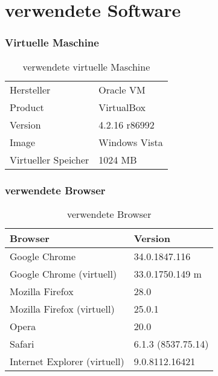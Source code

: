 	\section{verwendete Software}
	
	\subsubsection{Virtuelle Maschine}
	\begin{table}[H]
	 \vspace{-20pt}
 		\centering
			\begin{tabular}{| p{4cm} | p{8cm}  |}
			\hline
				Hersteller			&	Oracle VM\\
				Product			&	VirtualBox\\
				Version			&	4.2.16 r86992\\
				Image			&	Windows Vista\\
				Virtueller Speicher	&	1024 MB\\
				\hline
				\end{tabular}
			\caption{verwendete virtuelle Maschine}
	\end{table}
	
	\subsubsection{verwendete Browser}	
	\begin{table}[H]
	 \vspace{-20pt}
 		\centering
			\begin{tabular}{| p{8cm} | p{4cm}  |}
			\hline
				Browser		 	&	Version	\\
			\hline

			\hline
				Google Chrome			&	34.0.1847.116\\
				Google Chrome (virtuell)		&	33.0.1750.149 m\\
				Mozilla Firefox				&	28.0\\
				Mozilla Firefox (virtuell)		&	25.0.1\\
				Opera					&	20.0\\
				Safari					&	6.1.3 (8537.75.14)\\
				Internet Explorer (virtuell)		&	9.0.8112.16421\\
				\hline
				\end{tabular}
			\caption{verwendete Browser}
	\end{table}
	
	
	

